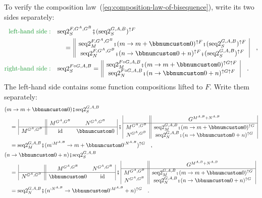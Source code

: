To verify the composition law~(\ref{eq:composition-law-of-bisequence}),
write its two sides separately:
\begin{align*}
{\color{greenunder}\text{left-hand side}:}\quad & \text{seq2}_{S}^{F,G^{A},G^{B}}\bef(\text{seq2}_{S}^{G,A,B})^{\uparrow F}\\
 & \quad=\,\begin{array}{||c|}
\text{seq2}_{M}^{F,G^{A},G^{B}}\bef(m\rightarrow m+\bbnum 0)^{\uparrow F}\bef(\text{seq2}_{S}^{G,A,B})^{\uparrow F}\\
\text{seq2}_{N}^{F,G^{A},G^{B}}\bef(n\rightarrow\bbnum 0+n)^{\uparrow F}\bef(\text{seq2}_{S}^{G,A,B})^{\uparrow F}
\end{array}\quad,\\
{\color{greenunder}\text{right-hand side}:}\quad & \text{seq2}_{S}^{F\circ G,A,B}=\,\begin{array}{||c|}
\text{seq2}_{M}^{F\circ G,A,B}\bef(m\rightarrow m+\bbnum 0)^{\uparrow G\uparrow F}\\
\text{seq2}_{N}^{F\circ G,A,B}\bef(n\rightarrow\bbnum 0+n)^{\uparrow G\uparrow F}
\end{array}\quad.
\end{align*}
The left-hand side contains some function compositions lifted to $F$.
Write them separately:
\begin{align*}
 & (m\rightarrow m+\bbnum 0)\bef\text{seq2}_{S}^{G,A,B}\\
 & \quad=\,\begin{array}{|c||cc|}
 & M^{G^{A},G^{B}} & N^{G^{A},G^{B}}\\
\hline M^{G^{A},G^{B}} & \text{id} & \bbnum 0
\end{array}\,\bef\,\begin{array}{|c||c|}
 & G^{M^{A,B}+N^{A,B}}\\
\hline M^{G^{A},G^{B}} & \text{seq2}_{M}^{G,A,B}\bef(m\rightarrow m+\bbnum 0)^{\uparrow G}\\
N^{G^{A},G^{B}} & \text{seq2}_{N}^{G,A,B}\bef(n\rightarrow\bbnum 0+n)^{\uparrow G}
\end{array}\\
 & \quad=\text{seq2}_{M}^{G,A,B}\bef(m^{:M^{A,B}}\rightarrow m+\bbnum 0^{:N^{A,B}})^{\uparrow G}\quad,\\
 & (n\rightarrow\bbnum 0+n)\bef\text{seq2}_{S}^{G,A,B}\\
 & \quad=\,\begin{array}{|c||cc|}
 & M^{G^{A},G^{B}} & N^{G^{A},G^{B}}\\
\hline N^{G^{A},G^{B}} & \bbnum 0 & \text{id}
\end{array}\,\bef\,\begin{array}{|c||c|}
 & G^{M^{A,B}+N^{A,B}}\\
\hline M^{G^{A},G^{B}} & \text{seq2}_{M}^{G,A,B}\bef(m\rightarrow m+\bbnum 0)^{\uparrow G}\\
N^{G^{A},G^{B}} & \text{seq2}_{N}^{G,A,B}\bef(n\rightarrow\bbnum 0+n)^{\uparrow G}
\end{array}\\
 & \quad=\text{seq2}_{N}^{G,A,B}\bef(n^{:N^{A,B}}\rightarrow\bbnum 0^{:M^{A,B}}+n)^{\uparrow G}\quad.
\end{align*}
